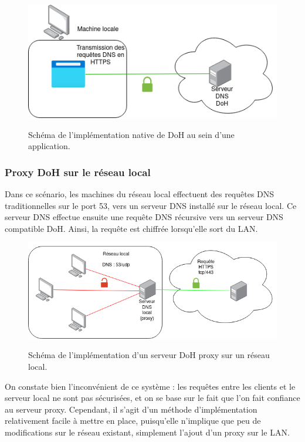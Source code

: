 \documentclass[a4paper,12pt]{article}
\begin{document}
	\begin{figure}[H]
		\begin{center}
			{\includegraphics[scale=0.6]{Images/schema_doh_native.png}}
		\end{center}
		\caption{Schéma de l'implémentation native de DoH au sein d'une application.}
	\end{figure}
	 
	
	\subsubsection{Proxy DoH sur le réseau local}
	
	Dans ce scénario, les machines du réseau local effectuent des requêtes DNS traditionnelles sur le port 53, vers un serveur DNS installé sur le réseau local. Ce serveur DNS effectue ensuite une requête DNS récursive vers un serveur DNS compatible DoH. Ainsi, la requête est chiffrée lorsqu'elle sort du LAN.
	
	\begin{figure}[H]
		\begin{center}
			{\includegraphics[scale=0.6]{Images/schema_doh_proxy_lan.png}}
		\end{center}
		\caption{Schéma de l'implémentation d'un serveur DoH proxy sur un réseau local.}
	\end{figure}
	
	On constate bien l'inconvénient de ce système : les requêtes entre les clients et le serveur local ne sont pas sécurisées, et on se base sur le fait que l'on fait confiance au serveur proxy.
	Cependant, il s'agit d'un méthode d'implémentation relativement facile à mettre en place, puisqu'elle n'implique que peu de modifications sur le réseau existant, simplement l'ajout d'un proxy sur le LAN.
	
\end{document}
